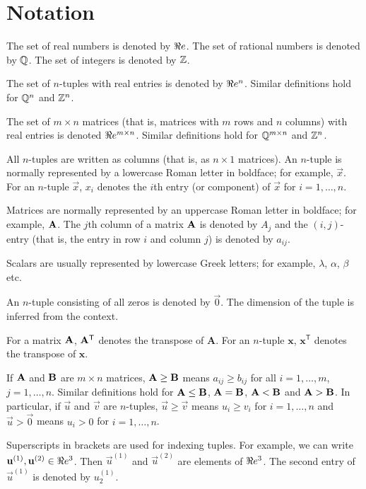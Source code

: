%


\section*{Notation}\label{notation}

The set of real numbers is denoted by \(\Re e\). The set of rational
numbers is denoted by \({\mathbb{Q}}\). The set of integers is denoted by
\({\mathbb{Z}}\).

The set of \(n\)-tuples with real entries is denoted by \(\Re e^n\).
Similar definitions hold for \({\mathbb{Q}}^n\) and \({\mathbb{Z}}^n\).

The set of \(m\times n\) matrices (that is, matrices with \(m\) rows and
\(n\) columns) with real entries is denoted \(\Re e^{m \times n}\).
Similar definitions hold for \({\mathbb{Q}}^{m\times n}\) and \({\mathbb{Z}}^n\).

All \(n\)-tuples are written as columns (that is, as \(n\times 1\)
matrices). An \(n\)-tuple is normally represented by a lowercase Roman
letter in boldface; for example, \(\vec{x}\). For an \(n\)-tuple
\(\vec{x}\), \(x_i\) denotes the \(i\)th entry (or component) of
\(\vec{x}\) for \(i = 1,\ldots, n\).

Matrices are normally represented by an uppercase Roman letter in
boldface; for example, \(\mathbf{A}\). The \(j\)th column of a matrix
\(\mathbf{A}\) is denoted by \(A_j\) and the \((i,j)\)-entry (that is, the
entry in row \(i\) and column \(j\)) is denoted by \(a_{ij}\).

Scalars are usually represented by lowercase Greek letters; for example,
\(\lambda\), \(\alpha\), \(\beta\) etc.

An \(n\)-tuple consisting of all zeros is denoted by \(\vec{0}\). The
dimension of the tuple is inferred from the context.

For a matrix \(\mathbf{A}\), \(\mathbf{A}^\mathsf{T}\) denotes the transpose of
\(\mathbf{A}\). For an \(n\)-tuple \(\mathbf{x}\),
\(\mathbf{x}^\mathsf{T}\) denotes the transpose of \(\mathbf{x}\).

If \(\mathbf{A}\) and \(\mathbf{B}\) are \(m\times n\) matrices,
\(\mathbf{A} \geq \mathbf{B}\) means \(a_{ij} \geq b_{ij}\) for all
\(i = 1,\ldots, m\), \(j = 1,\ldots, n\). Similar definitions hold for
\(\mathbf{A} \leq \mathbf{B}\), \(\mathbf{A} = \mathbf{B}\), \(\mathbf{A} < \mathbf{B}\) and
\(\mathbf{A} > \mathbf{B}\). In particular, if \(\vec{u}\) and \(\vec{v}\) are
\(n\)-tuples, \(\vec{u}\geq \vec{v}\) means \(u_i \geq v_i\) for
\(i= 1,\ldots, n\) and \(\vec{u} \gt \vec{0}\) means \(u_i \gt 0\) for
\(i = 1,\ldots,n\).

Superscripts in brackets are used for indexing tuples. For example, we
can write \(\mathbf{u}^{(1)},\mathbf{u}^{(2)} \in \Re e^3\). Then
\(\vec{u}^{(1)}\) and \(\vec{u}^{(2)}\) are elements of \(\Re e^3\). The
second entry of \(\vec{u}^{(1)}\) is denoted by \(u^{(1)}_2.\)